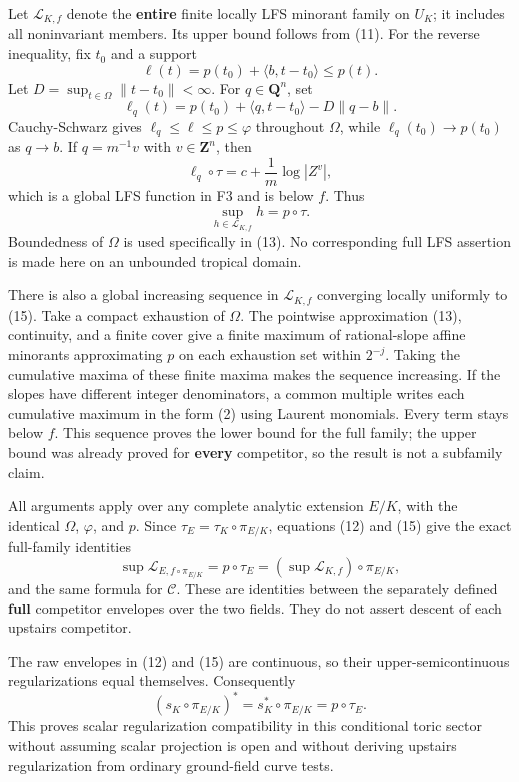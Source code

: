 \documentclass[11pt]{article}
\begin{document}
Let \(\mathcal L_{K,f}\) denote the \textbf{entire} finite locally LFS minorant family on \(U_K\); it includes all noninvariant members. Its upper bound follows from (11). For the reverse inequality, fix \(t_0\) and a support
\[
\ell(t)=p(t_0)+\langle b,t-t_0\rangle\leq p(t).
\]
Let \(D=\sup_{t\in\Omega}\|t-t_0\|<\infty\). For \(q\in\mathbf Q^n\), set
\[
\ell_q(t)=p(t_0)+\langle q,t-t_0\rangle-D\|q-b\|.
\tag{13}
\]
Cauchy-Schwarz gives \(\ell_q\leq\ell\leq p\leq\varphi\) throughout \(\Omega\), while \(\ell_q(t_0)\to p(t_0)\) as \(q\to b\). If \(q=m^{-1}v\) with \(v\in\mathbf Z^n\), then
\[
\ell_q\circ\tau=c+\frac1m\log|Z^v|,
\tag{14}
\]
which is a global LFS function in F3 and is below \(f\). Thus
\[
\boxed{\sup_{h\in\mathcal L_{K,f}}h=p\circ\tau.}
\tag{15}
\]
Boundedness of \(\Omega\) is used specifically in (13). No corresponding full LFS assertion is made here on an unbounded tropical domain.

There is also a global increasing sequence in \(\mathcal L_{K,f}\) converging locally uniformly to (15). Take a compact exhaustion of \(\Omega\). The pointwise approximation (13), continuity, and a finite cover give a finite maximum of rational-slope affine minorants approximating \(p\) on each exhaustion set within \(2^{-j}\). Taking the cumulative maxima of these finite maxima makes the sequence increasing. If the slopes have different integer denominators, a common multiple writes each cumulative maximum in the form (2) using Laurent monomials. Every term stays below \(f\). This sequence proves the lower bound for the full family; the upper bound was already proved for \textbf{every} competitor, so the result is not a subfamily claim.

All arguments apply over any complete analytic extension \(E/K\), with the identical \(\Omega\), \(\varphi\), and \(p\). Since \(\tau_E=\tau_K\circ\pi_{E/K}\), equations (12) and (15) give the exact full-family identities
\[
\sup\mathcal L_{E,f\circ\pi_{E/K}}
=p\circ\tau_E
=(\sup\mathcal L_{K,f})\circ\pi_{E/K},
\tag{16}
\]
and the same formula for \(\mathcal C\). These are identities between the separately defined \textbf{full} competitor envelopes over the two fields. They do not assert descent of each upstairs competitor.

The raw envelopes in (12) and (15) are continuous, so their upper-semicontinuous regularizations equal themselves. Consequently
\[
(s_K\circ\pi_{E/K})^*=s_K^*\circ\pi_{E/K}=p\circ\tau_E.
\tag{17}
\]
This proves scalar regularization compatibility in this conditional toric sector without assuming scalar projection is open and without deriving upstairs regularization from ordinary ground-field curve tests.
\end{document}
